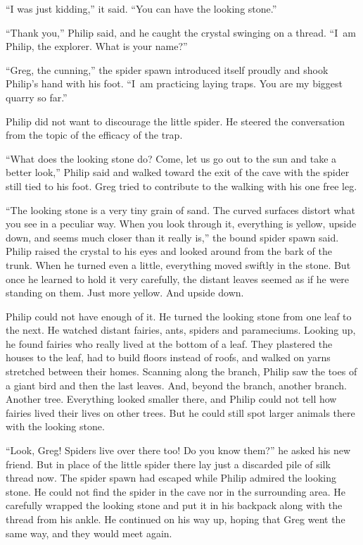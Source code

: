 \documentclass[10pt]{memoir}
\begin{document}
``I was just kidding,'' it said. ``You can have the looking stone.''

``Thank you,'' Philip said, and he caught the crystal swinging on a thread.
``I~am Philip, the explorer. What is your name?''

``Greg, the cunning,'' the spider spawn introduced itself proudly and shook
Philip's hand with his foot. ``I~am practicing laying traps. You are my biggest
quarry so far.''

Philip did not want to discourage the little spider. He steered the
conversation from the topic of the efficacy of the trap.

``What does the looking stone do? Come, let us go out to the sun and take a
better look,'' Philip said and walked toward the exit of the cave with the
spider still tied to his foot. Greg tried to contribute to the walking with his
one free leg.

``The looking stone is a very tiny grain of sand. The curved surfaces distort
what you see in a peculiar way. When you look through it, everything is yellow,
upside down, and seems much closer than it really is,'' the bound spider spawn
said. Philip raised the crystal to his eyes and looked around from the bark of
the trunk. When he turned even a little, everything moved swiftly in the stone.
But once he learned to hold it very carefully, the distant leaves seemed as if
he were standing on them. Just more yellow. And upside down.

Philip could not have enough of it. He turned the looking stone from one leaf
to the next. He watched distant fairies, ants, spiders and parameciums. Looking
up, he found fairies who really lived at the bottom of a leaf. They plastered
the houses to the leaf, had to build floors instead of roofs, and walked on
yarns stretched between their homes. Scanning along the branch, Philip saw the
toes of a giant bird and then the last leaves. And, beyond the branch, another
branch. Another tree. Everything looked smaller there, and Philip could not
tell how fairies lived their lives on other trees. But he could still spot
larger animals there with the looking stone.

``Look, Greg! Spiders live over there too! Do you know them?'' he asked his new
friend. But in place of the little spider there lay just a discarded pile of
silk thread now. The spider spawn had escaped while Philip admired the looking
stone. He could not find the spider in the cave nor in the surrounding area. He
carefully wrapped the looking stone and put it in his backpack along with the
thread from his ankle. He continued on his way up, hoping that Greg went the
same way, and they would meet again.
\end{document}
